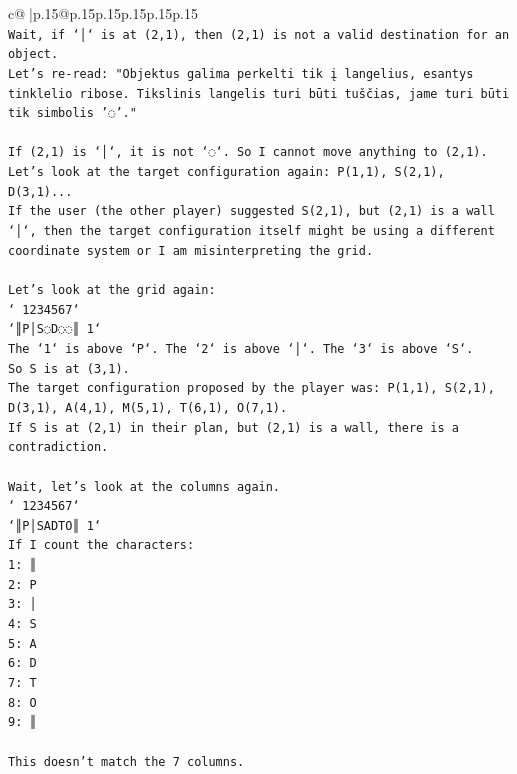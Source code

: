\documentclass{article}
\begin{document}
{\begin{supertabular}{c@{$\;$}|p{.15\linewidth}@{}p{.15\linewidth}p{.15\linewidth}p{.15\linewidth}p{.15\linewidth}p{.15\linewidth}}
{{{\\ 
\texttt{Wait, if `│` is at (2,1), then (2,1) is not a valid destination for an object.} \\
\texttt{Let's re{-}read: "Objektus galima perkelti tik į langelius, esantys tinklelio ribose. Tikslinis langelis turi būti tuščias, jame turi būti tik simbolis '◌'."} \\
\\ 
\texttt{If (2,1) is `│`, it is not `◌`. So I cannot move anything to (2,1).} \\
\texttt{Let's look at the target configuration again: P(1,1), S(2,1), D(3,1)...} \\
\texttt{If the user (the other player) suggested S(2,1), but (2,1) is a wall `│`, then the target configuration itself might be using a different coordinate system or I am misinterpreting the grid.} \\
\\ 
\texttt{Let's look at the grid again:} \\
\texttt{` 1234567`} \\
\texttt{`║P│S◌D◌◌║ 1`} \\
\texttt{The `1` is above `P`. The `2` is above `│`. The `3` is above `S`.} \\
\texttt{So S is at (3,1).} \\
\texttt{The target configuration proposed by the player was: P(1,1), S(2,1), D(3,1), A(4,1), M(5,1), T(6,1), O(7,1).} \\
\texttt{If S is at (2,1) in their plan, but (2,1) is a wall, there is a contradiction.} \\
\\ 
\texttt{Wait, let's look at the columns again.} \\
\texttt{` 1234567`} \\
\texttt{`║P│SADTO║ 1`} \\
\texttt{If I count the characters:} \\
\texttt{1: ║} \\
\texttt{2: P} \\
\texttt{3: │} \\
\texttt{4: S} \\
\texttt{5: A} \\
\texttt{6: D} \\
\texttt{7: T} \\
\texttt{8: O} \\
\texttt{9: ║} \\
\\ 
\texttt{This doesn't match the 7 columns.} \\
}}}
\end{supertabular}}
\end{document}
